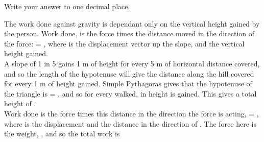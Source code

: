 
\begin{problem}[O1980PIQ2a]%
{  Write your answer to one decimal place.

 }
{}
{The work done against gravity is dependant only on the vertical height gained by the person. Work done,  is the force times the distance moved in the direction of the force:  = , where  is the displacement vector up the slope, and  the vertical height gained. \\

A slope of 1 in 5 gains 1 m of height for every 5 m of horizontal distance covered, and so the length of the hypotenuse will give the distance along the hill covered for every 1 m of height gained. Simple Pythagoras gives that the hypotenuse of the triangle is  = , and so for every  walked,  in height is gained. This gives a total height of .\\

Work done is the force times this distance in the direction the force is acting,  = , where  is the displacement and  the distance in the direction of . The force here is the weight, , and so the total work is  
}
\end{problem}